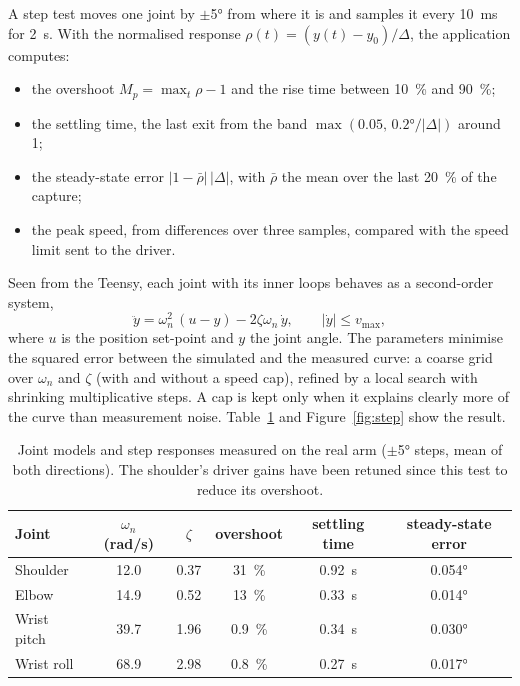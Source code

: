 \documentclass[11pt,a4paper]{article}
\begin{document}
A step test moves one joint by $\pm$\ang{5} from where it is and samples it every \SI{10}{\milli\second} for
\SI{2}{\second}. With the normalised response $\rho(t)=(y(t)-y_0)/\Delta$, the application computes:
\begin{itemize}
\item the overshoot $M_p=\max_t\rho-1$ and the rise time between \SI{10}{\percent} and \SI{90}{\percent};
\item the settling time, the last exit from the band $\max(0.05,\,\ang{0.2}/|\Delta|)$ around 1;
\item the steady-state error $|1-\bar\rho|\,|\Delta|$, with $\bar\rho$ the mean over the last
      \SI{20}{\percent} of the capture;
\item the peak speed, from differences over three samples, compared with the speed limit sent to the driver.
\end{itemize}
Seen from the Teensy, each joint with its inner loops behaves as a second-order system,
\begin{equation}
  \ddot y=\omega_n^2\,(u-y)-2\zeta\omega_n\,\dot y,\qquad |\dot y|\le v_{\max},
  \label{eq:model}
\end{equation}
where $u$ is the position set-point and $y$ the joint angle. The parameters minimise the squared error between
the simulated and the measured curve: a coarse grid over $\omega_n$ and $\zeta$ (with and without a speed cap),
refined by a local search with shrinking multiplicative steps. A cap is kept only when it explains clearly more
of the curve than measurement noise. Table~\ref{tab:models} and Figure~\ref{fig:step} show the result.

\begin{table}[ht]
\centering\small
\begin{tabular}{@{}lccccc@{}}
\toprule
Joint & $\omega_n$ (rad/s) & $\zeta$ & overshoot & settling time & steady-state error \\
\midrule
Shoulder    & 12.0 & 0.37 & \SI{31}{\percent}  & \SI{0.92}{\second} & \ang{0.054} \\
Elbow       & 14.9 & 0.52 & \SI{13}{\percent}  & \SI{0.33}{\second} & \ang{0.014} \\
Wrist pitch & 39.7 & 1.96 & \SI{0.9}{\percent} & \SI{0.34}{\second} & \ang{0.030} \\
Wrist roll  & 68.9 & 2.98 & \SI{0.8}{\percent} & \SI{0.27}{\second} & \ang{0.017} \\
\bottomrule
\end{tabular}
\caption{Joint models and step responses measured on the real arm ($\pm$\ang{5} steps, mean of both
directions). The shoulder's driver gains have been retuned since this test to reduce its overshoot.}
\label{tab:models}
\end{table}
\end{document}
